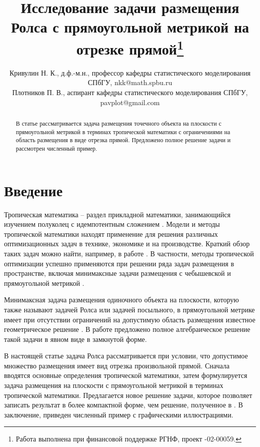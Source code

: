 \documentclass{spisok-article}
\title{Исследование задачи размещения Ролса с прямоугольной метрикой на отрезке прямой\thanks{ Работа выполнена при финансовой поддержке РГНФ, проект \textnumero 16-02-00059.}
}
\author{Кривулин Н. К.,
	д.ф.-м.н., профессор кафедры статистического моделирования СПбГУ, nkk@math.spbu.ru\\
	Плотников П. В.,
	аспирант кафедры статистического моделирования СПбГУ,
	pavplot@gmail.com
}
\begin{document}
\maketitle

\begin{abstract}
	В статье рассматривается задача размещения точечного объекта на плоскости с прямоугольной метрикой в терминах тропической математики с ограничениями на область размещения в виде отрезка прямой. Предложено полное решение задачи и рассмотрен численный пример. 
\end{abstract}

\section{Введение}

Тропическая математика -- раздел прикладной математики, занимающийся изучением полуколец с идемпотентным сложением \cite{Maslov1994Idempotent,Golan2003Semirings,Krivulin2009Methods,Butkovic2010Maxlinear}. Модели и методы тропической математики находят применение для решения различных оптимизационных задач в технике, экономике и на производстве. Краткий обзор таких задач можно найти, например, в работе \cite{Krivulin2014Tropical}. В частности, методы тропической оптимизации успешно применяются при решении ряда задач размещения в пространстве, включая минимаксные задачи размещения с чебышевской и прямоугольной метрикой \cite{Krivulin2011Analgebraic,Krivulin2012Anewalgebraic,Krivulin2015Onanalgebraic}.

Минимаксная задача размещения одиночного объекта на плоскости, которую также называют задачей Ролса или задачей посыльного, в прямоугольной метрике имеет при отсутствии ограничений на допустимую область размещения известное геометрическое решение \cite{Elzinga1972Geometrical,Francis1972Ageometrical}. В работе \cite{Krivulin2015Onanalgebraic} предложено полное алгебраическое решение такой задачи в явном виде в замкнутой форме. 

В настоящей статье задача Ролса рассматривается при условии, что допустимое множество размещения имеет вид отрезка произвольной прямой. Сначала вводятся основные определения тропической математики, затем формулируется задача размещения на плоскости с прямоугольной метрикой в терминах тропической математики. Предлагается новое решение задачи, которое позволяет записать результат в более компактной форме, чем решение, полученное в \cite{Krivulin2016Usingtrop}. В заключение, приведен численный пример с графическими иллюстрациями. 
\end{document}
